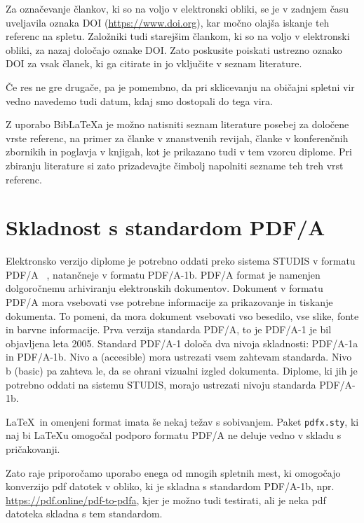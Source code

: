 \documentclass[a4paper,12pt,openright]{book}
\newcommand{\BibLaTeX}{{\sc Bib}\LaTeX}
\begin{document}
Za označevanje člankov, ki so na voljo v elektronski obliki, se je v zadnjem času uveljavila oznaka DOI
(\url{https://www.doi.org}), kar močno olajša iskanje teh referenc na spletu.
Založniki tudi starejšim člankom, ki so na voljo v elektronski obliki, za nazaj določajo oznake DOI.
Zato poskusite poiskati ustrezno oznako DOI za vsak članek, ki ga citirate in jo vključite v seznam literature.

Če res ne gre drugače, pa je pomembno, da pri sklicevanju na običajni spletni vir vedno navedemo tudi datum, kdaj smo dostopali do tega vira.

Z uporabo \BibLaTeX{a} je možno natisniti seznam literature posebej za določene vrste referenc, na primer za članke v znanstvenih revijah, članke v konferenčnih zbornikih in poglavja v knjigah, kot je prikazano tudi v tem vzorcu diplome. Pri zbiranju literature si zato prizadevajte čimbolj napolniti sezname teh treh vrst referenc.


\chapter{Skladnost s standardom PDF/A}
\label{PDF}


Elektronsko verzijo diplome je potrebno oddati preko sistema STUDIS v formatu PDF/A ~\cite{howtopdfa,pdfa},
natančneje v formatu PDF/A-1b.
PDF/A format je namenjen dolgoročnemu arhiviranju elektronskih dokumentov.
Dokument v formatu PDF/A mora vsebovati vse potrebne informacije za prikazovanje in tiskanje dokumenta. To pomeni, da mora dokument  vsebovati vso besedilo, vse slike, fonte in barvne informacije.
Prva verzija standarda PDF/A, to je PDF/A-1 je bil objavljena leta 2005.
Standard PDF/A-1 določa dva nivoja skladnosti: PDF/A-1a in PDF/A-1b.
Nivo a (accesible) mora ustrezati vsem zahtevam standarda.
Nivo b (basic) pa zahteva le, da se ohrani vizualni izgled dokumenta.
Diplome, ki jih je potrebno oddati na sistemu STUDIS, morajo ustrezati nivoju standarda
PDF/A-1b.

\LaTeX\ in omenjeni format imata še nekaj težav s sobivanjem.
Paket \texttt{pdfx.sty}, ki naj bi \LaTeX{u} omogočal podporo formatu PDF/A ne deluje vedno
v skladu s pričakovanji.

Zato raje priporočamo uporabo enega od mnogih spletnih mest, ki omo\-go\-ča\-jo konverzijo pdf datotek v obliko,
ki je skladna s standardom PDF/A-1b, npr. \url{https://pdf.online/pdf-to-pdfa}, kjer je
možno tudi testirati, ali je neka pdf datoteka skladna s tem standardom.
\end{document}
